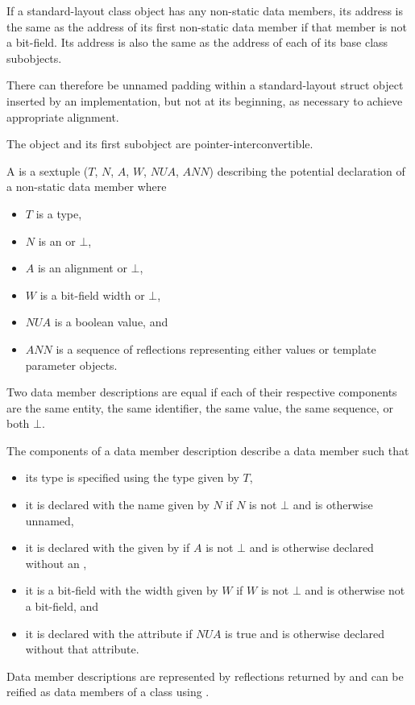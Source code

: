 \pnum
If a standard-layout class object has any non-static data members, its address
is the same as the address of its first non-static data member
if that member is not a bit-field. Its
address is also the same as the address of each of its base class subobjects.
\begin{note}
There can therefore be unnamed padding within a standard-layout struct object
inserted by an implementation, but
not at its beginning, as necessary to achieve appropriate alignment.
\end{note}
\begin{note}
The object and its first subobject are
pointer-interconvertible.
\end{note}

\pnum
A  is
a sextuple ($T$, $N$, $A$, $W$, $\mathit{NUA}$, $\mathit{ANN}$)
describing the potential declaration of a non-static data member where
\begin{itemize}
\item $T$ is a type,
\item $N$ is an  or $\bot$,
\item $A$ is an alignment or $\bot$,
\item $W$ is a bit-field width or $\bot$,
\item $\mathit{NUA}$ is a boolean value, and
\item $\mathit{ANN}$ is a sequence of reflections
representing either values or template parameter objects.
\end{itemize}
Two data member descriptions are equal
if each of their respective components are
the same entity,
the same identifier,
the same value,
the same sequence, or
both $\bot$.
\begin{note}
The components of a data member description describe a data member such that
\begin{itemize}
\item
its type is specified using the type given by $T$,
\item
it is declared with the name given by $N$
if $N$ is not $\bot$ and is otherwise unnamed,
\item
it is declared with the 
given by 
if $A$ is not $\bot$ and
is otherwise declared without an ,
\item
it is a bit-field with the width given by $W$
if $W$ is not $\bot$ and is otherwise not a bit-field, and
\item
it is declared with
the attribute 
if $\mathit{NUA}$ is true and is otherwise declared without that attribute.
\end{itemize}
Data member descriptions are represented by reflections
returned by  and
can be reified as data members of a class using .
\end{note}

